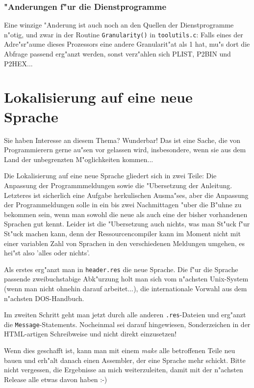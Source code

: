 \documentclass[12pt,a4paper,twoside]{report}
\begin{document}
\subsubsection{"Anderungen f"ur die Dienstprogramme}

Eine winzige "Anderung ist auch noch an den Quellen der Dienstprogramme
n"otig, und zwar in der Routine {\tt Granularity()} in {\tt toolutils.c}:
Falls eines der Adre"sr"aume dieses Prozessors eine andere Granularit"at
als 1 hat, mu"s dort die Abfrage passend erg"anzt werden, sonst verz"ahlen
sich PLIST, P2BIN und P2HEX...


\section{Lokalisierung auf eine neue Sprache}

Sie haben Interesse an diesem Thema?  Wunderbar!  Das ist eine Sache, die
von Programmierern gerne au"sen vor gelassen wird, insbesondere, wenn sie
aus dem Land der unbegrenzten M"oglichkeiten kommen...

Die Lokalisierung auf eine neue Sprache gliedert sich in zwei Teile: Die
Anpassung der Programmmeldungen sowie die "Ubersetzung der Anleitung.
Letzteres ist sicherlich eine Aufgabe herkulischen Ausma"ses, aber die
Anpassung der Programmeldungen solle in ein bis zwei Nachmittagen "uber
die B"uhne zu bekommen sein, wenn man sowohl die neue als auch eine der
bisher vorhandenen Sprachen gut kennt.  Leider ist die "Ubersetzung auch
nichts, was man St"uck f"ur St"uck machen kann, denn der
Ressourcencompiler kann im Moment nicht mit einer variablen Zahl von
Sprachen in den verschiedenen Meldungen umgehen, es hei"st also 'alles
oder nichts'.

Als erstes erg"anzt man in {\tt header.res} die neue Sprache.  Die f"ur
die Sprache passende zweibuchstabige Abk"urzung holt man sich vom
n"achsten Unix-System (wenn man nicht ohnehin darauf arbeitet...), die
internationale Vorwahl aus dem n"achsten DOS-Handbuch.

Im zweiten Schritt geht man jetzt durch alle anderen {\tt .res}-Dateien
und erg"anzt die {\tt Message}-Statements.  Nocheinmal sei darauf
hingewiesen, Sonderzeichen in der HTML-artigen Schreibweise und nicht
direkt einzusetzen!

Wenn dies geschafft ist, kann man mit einem {\em make} alle betroffenen
Teile neu bauen und erh"alt danach einen Assembler, der eine Sprache mehr
schickt.  Bitte nicht vergessen, die Ergebnisse an mich weiterzuleiten,
damit mit der n"achsten Release alle etwas davon haben :-)
\end{document}
